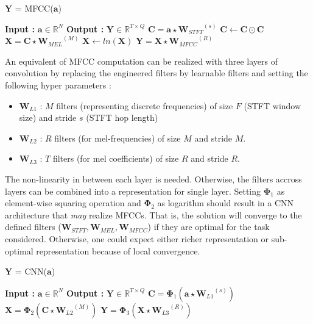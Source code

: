 \begin{algorithm}
  \caption{$\textbf{Y}$ = MFCC($\textbf{a}$) }\label{MFCC_engineer}
  \begin{algorithmic}[1]
    \Statex \textbf{Input :} $\textbf{a} \in \mathbb{R}^{N}$
    \Statex \textbf{Output :} $\textbf{Y} \in \mathbb{R}^{T \times Q}$ 
    \State $\textbf{C} = \textbf{a} \star {\textbf{W}_{STFT}}^{(s)}$ 
    \State $\textbf{C} \leftarrow \textbf{C} \odot \textbf{C}$ 
    \State $\textbf{X} = \textbf{C} \star {\textbf{W}_{MEL}}^{(M)}$ 
    \State $\textbf{X} \leftarrow ln(\textbf{X})$
    \State $\textbf{Y} = \textbf{X} \star {\textbf{W}_{MFCC}}^{(R)}$ 
  \end{algorithmic}
\end{algorithm}
\FloatBarrier
\noindent An equivalent of MFCC computation can be realized with three layers of convolution by replacing the engineered filters by learnable filters and setting the following hyper parameters :
\begin{itemize}
\setlength\itemsep{0em}
\item $\textbf{W}_{L1}$ : $M$ filters (representing discrete frequencies) of size $F$ (STFT window size) and stride $s$ (STFT hop length)
\item $\textbf{W}_{L2}$ : $R$ filters (for mel-frequencies) of size $M$ and stride $M$.
\item $\textbf{W}_{L3}$ : $T$ filters (for mel coefficients) of size $R$ and stride $R$.   
\end{itemize}
The non-linearity in between each layer is needed. Otherwise, the filters accross layers can be combined into a representation for single layer. Setting $\bm{\Phi}_{1}$ as element-wise squaring operation and $\bm{\Phi}_{2}$ as logarithm should result in a CNN architecture that \textit{may} realize MFCCs. That is, the solution will converge to the defined filters ($\textbf{W}_{STFT}, \textbf{W}_{MEL}, \textbf{W}_{MFCC}$) if they are optimal for the task considered. Otherwise, one could expect either richer representation or sub-optimal representation because of local convergence.  
\begin{algorithm}
  \caption{$\textbf{Y}$ = CNN($\textbf{a}$) }\label{MFCC_learn}
  \begin{algorithmic}[1]
    \Statex \textbf{Input :} $\textbf{a} \in \mathbb{R}^{N}$
    \Statex \textbf{Output :} $\textbf{Y} \in \mathbb{R}^{T \times Q}$ 
    \State $\textbf{C} = \bm{\Phi}_{1} (\textbf{a} \star {\textbf{W}_{L1}}^{(s)})$ 
    \State $\textbf{X} = \bm{\Phi}_{2} (\textbf{C} \star {\textbf{W}_{L2}}^{(M)})$ 
    \State $\textbf{Y} = \bm{\Phi}_{3} (\textbf{X} \star {\textbf{W}_{L3}}^{(R)})$ 
  \end{algorithmic}
\end{algorithm}
